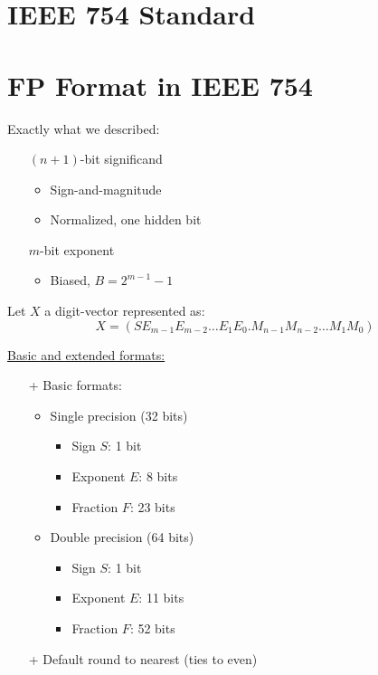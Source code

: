 \documentclass[12pt,openany]{book}
\begin{document}
			      	
			      	\newpage 
			      	\section{IEEE 754 Standard}
			      	\section*{FP Format in IEEE 754}
			      	
			      	Exactly what we described:
			      	\begin{itemize}
			      		\item[] \( (n + 1) \)-bit significand
			      		      \begin{itemize}
			      		      	\item Sign-and-magnitude
			      		      	\item Normalized, one hidden bit
			      		      \end{itemize}
			      		\item[] \( m \)-bit exponent
			      		      \begin{itemize}
			      		      	\item Biased, \( B = 2^{m-1} - 1 \)
			      		      \end{itemize}
			      	\end{itemize}
			      	
			      	Let \( X \) a digit-vector represented as:
			      	\[ X = (S E_{m-1} E_{m-2} \ldots E_1 E_0 . M_{n-1} M_{n-2} \ldots M_1 M_0) \]
			      	
			      	\underline{Basic and extended formats:}
			      	\begin{itemize}
			      		\item[+] Basic formats:
			      		      \begin{itemize}
			      		      	\item Single precision (32 bits)
			      		      	      \begin{itemize}
			      		      	      	\item Sign \( S \): 1 bit
			      		      	      	\item Exponent \( E \): 8 bits
			      		      	      	\item Fraction \( F \): 23 bits
			      		      	      \end{itemize}
			      		      	\item Double precision (64 bits)
			      		      	      \begin{itemize}
			      		      	      	\item Sign \( S \): 1 bit
			      		      	      	\item Exponent \( E \): 11 bits
			      		      	      	\item Fraction \( F \): 52 bits
			      		      	      \end{itemize}
			      		      \end{itemize}
			      		\item[+] Default round to nearest (ties to even)
			      	\end{itemize}
			      	
\end{document}
